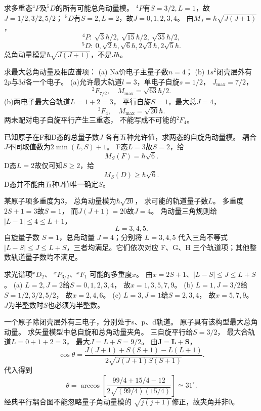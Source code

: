 求多重态\({}^{4}P\)及\({}^{5}D\)的所有可能总角动量模。
\exsolution
\({}^{4}P\)有$S=3/2,L=1$，故$J=1/2,3/2,5/2$；
\({}^{5}D\)有$S=2,L=2$，故$J=0,1,2,3,4$。
由$M_J=\hbar\sqrt{J(J+1)}$，
\[
 \boxed{{}^{4}P:\ \sqrt3\hbar/2,\ \sqrt{15}\hbar/2,\ \sqrt{35}\hbar/2},
\]
\[
 \boxed{{}^{5}D:\ 0,\sqrt2\hbar,\sqrt6\hbar,2\sqrt3\hbar,2\sqrt5\hbar}.
\]
\excheck 总角动量模是$\hbar\sqrt{J(J+1)}$，不是$J\hbar$。

求最大总角动量及相应谱项：
(a) Na价电子主量子数$n=4$；
(b) $1s^2$闭壳层外有$2p$与$3d$各一个电子。
\exsolution
(a)允许最大轨道$l=3$，单电子自旋$s=1/2$，
$J_{\max}=7/2$，
\[
 \boxed{{}^{2}F_{7/2},\quad M_{\max}=\sqrt{63}\hbar/2}.
\]
(b)两电子最大合轨道$L=1+2=3$，
平行自旋$S=1$，最大总$J=4$，
\[
 \boxed{{}^{3}F_4,\quad M_{\max}=\sqrt{20}\hbar}.
\]
\excheck 两未配对电子自旋平行产生三重态，
不能写成不可能的\({}^{2}F_4\)。

已知原子在F和D态的总量子数$J$
各有五种允许值，求两态的自旋角动量模。
\exsolution
耦合$J$不同取值数为$2\min(L,S)+1$。
F态$L=3$故$S=2$，给
\[
 \boxed{M_S(F)=\hbar\sqrt6}.
\]
D态$L=2$故仅可知$S\ge2$，给
\[
 \boxed{M_S(D)\ge\hbar\sqrt6}.
\]
\excheck D态并不能由五种$J$值唯一确定$S$。

某原子项多重度为3，
总角动量模为$\hbar\sqrt{20}$，
求可能的轨道量子数$L$。
\exsolution
多重度$2S+1=3$故$S=1$，
而$J(J+1)=20$故$J=4$。
角动量三角规则给
$|L-1|\le4\le L+1$，
\[
 \boxed{L=3,4,5}.
\]
\excheck 自旋量子数 $S=1$，总角动量 $J=4$；分别将 $L=3,4,5$ 代入三角不等式 $|L-S|\le J\le L+S$，三者均满足。它们依次对应 F、G、H 三个轨道项；其他整数轨道量子数均不满足。

求光谱项\({}^{x}D_2\)、
\({}^{x}P_{3/2}\)、\({}^{x}F_1\)
可能的多重度$x$。
\exsolution
由$x=2S+1$、$|L-S|\le J\le L+S$。
(a) $L=2,J=2$给$S=0,1,2,3,4$，
故$\boxed{x=1,3,5,7,9}$。
(b) $L=1,J=3/2$给$S=1/2,3/2,5/2$，
故$\boxed{x=2,4,6}$。
(c) $L=3,J=1$给$S=2,3,4$，
故$\boxed{x=5,7,9}$。
\excheck $J$为半整数时$S$也必须为半整数。

一个原子除闭壳层外有三电子，分别处于s、p、d轨道。
原子具有该构型最大总角动量。
求矢量模型中总自旋和总角动量夹角。
\exsolution
三自旋平行给$S=3/2$，
最大合轨道$L=0+1+2=3$，
最大$J=L+S=9/2$。
由$\boldsymbol J=\boldsymbol L+\boldsymbol S$，
\[
 \cos\theta=\frac{J(J+1)+S(S+1)-L(L+1)}
 {2\sqrt{J(J+1)S(S+1)}}.
\]
代入得到
\[
 \boxed{\theta=\arccos\left[
 \frac{99/4+15/4-12}{2\sqrt{(99/4)(15/4)}}\right]
 \simeq31^\circ}.
\]
\excheck 经典平行耦合图不能忽略量子角动量模的
$\sqrt{j(j+1)}$修正，故夹角并非0。


